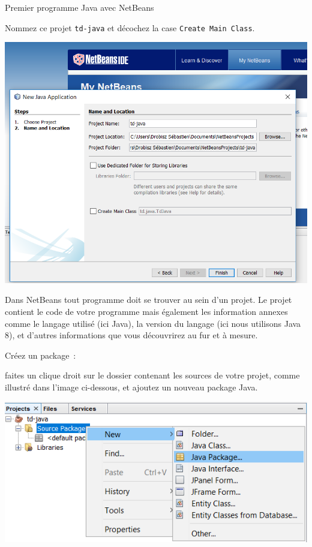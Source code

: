 \documentclass[a4paper,11pt]{article}
\begin{document}
\begin{Tutoriel}{Premier programme Java avec NetBeans}
\begin{steps}
			Nommez ce projet \texttt{td-java} et décochez la case \texttt{Create Main Class}.
			
			\begin{center}
				\includegraphics[width=\textwidth]{images/nb_newproject_name}
			\end{center}
			
			Dans NetBeans tout programme doit se trouver au sein d'un projet.
			Le projet contient le code de votre programme mais également les 
			information annexes comme le langage utilisé (ici Java), 
			la version du langage (ici nous utilisons Java 8), 
			et d'autres informations que vous découvrirez au fur et à mesure.



		\item Créez un package~: 
		
			faites un clique droit sur le dossier contenant les sources de votre projet, 
			comme illustré dans l'image ci-dessous, et ajoutez un nouveau package Java.
		
			\bigskip
			\begin{center}
				\includegraphics[width=\textwidth]{images/nb_newproject_package}
			\end{center}


\end{steps}
\end{Tutoriel}
\end{document}
